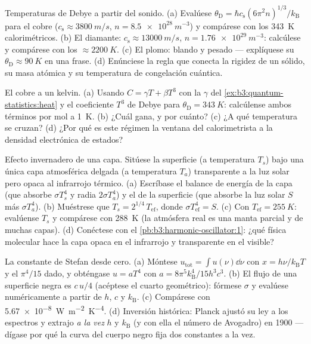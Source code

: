\begin{exercise}[$\star\star$]\label{exo:b3:photons-phonons:7}
Temperaturas de Debye a partir del sonido. (a) Evalúese $\theta_{\text{D}} =
\hbar c_{\text{s}}(6\pi^2n)^{1/3}/k_{\text{B}}$ para el cobre
($c_{\text{s}} \approx \qty{3800}{m/s}$, $n =
\qty{8.5e28}{m^{-3}}$) y compárese con los
\qty{343}{K} calorimétricos. (b) El diamante: $c_{\text{s}} \approx
\qty{13000}{m/s}$, $n = \qty{1.76e29}{m^{-3}}$: calcúlese y
compárese con los $\approx\qty{2200}{K}$. (c) El plomo: blando y pesado ---
explíquese su $\theta_{\text{D}} \approx \qty{90}{K}$ en una
frase. (d) Enúnciese la regla que conecta la rigidez de un sólido, su
masa atómica y su temperatura de congelación cuántica.
\end{exercise}

\begin{exercise}[$\star\star$]\label{exo:b3:photons-phonons:8}
El cobre a un kelvin. (a) Usando $C = \gamma T + \beta T^3$ con
la $\gamma$ del \cref{ex:b3:quantum-statistics:heat} y el coeficiente
$T^3$ de Debye para $\theta_{\text{D}} = \qty{343}{K}$: calcúlense
ambos términos por mol a \qty{1}{K}. (b) ¿Cuál gana, y por cuánto? (c) ¿A qué
temperatura se cruzan? (d) ¿Por qué es este
régimen la ventana del calorimetrista a la densidad electrónica de
estados?
\end{exercise}

\begin{exercise}[$\star\star$]\label{exo:b3:photons-phonons:9}
Efecto invernadero de una capa. Sitúese la superficie (a temperatura $T_s$)
bajo una única capa atmosférica delgada (a temperatura $T_a$) transparente
a la luz solar pero opaca al infrarrojo térmico. (a) Escríbase el balance
de energía de la capa (que absorbe $\sigma T_s^4$ y radia
$2\sigma T_a^4$) y el de la superficie (que absorbe la luz solar $S$ más
$\sigma T_a^4$). (b) Muéstrese que $T_s = 2^{1/4}\,T_{\text{ef}}$, donde
$\sigma T_{\text{ef}}^4 = S$. (c) Con $T_{\text{ef}} =
\qty{255}{K}$: evalúense $T_s$ y compárese con \qty{288}{K}
(la atmósfera real es una manta parcial y de muchas capas). (d)
Conéctese con el \cref{pb:b3:harmonic-oscillator:1}: ¿qué física
molecular hace la capa opaca en el infrarrojo y transparente en
el visible?
\end{exercise}

\begin{exercise}[$\star\star\star$]\label{exo:b3:photons-phonons:10}
La constante de Stefan desde cero. (a) Móntese $u_{\text{tot}} =
\int u(\nu)\dd\nu$ con $x = h\nu/k_{\text{B}}T$ y el
$\pi^4/15$ dado, y obténgase $u = aT^4$ con $a =
8\pi^5k_{\text{B}}^4/15h^3c^3$. (b) El flujo de una superficie
negra es $c\,u/4$ (acéptese el cuarto geométrico): fórmese
$\sigma$ y evalúese numéricamente a partir de $h$, $c$ y
$k_{\text{B}}$. (c) Compárese con \qty{5.67e-8}{W.m^{-2}.K^{-4}}.
(d) Inversión histórica: Planck ajustó su ley a los espectros y
extrajo \emph{a la vez} $h$ y $k_{\text{B}}$ (y con ella el número de
Avogadro) en 1900 --- dígase por qué la curva del cuerpo negro fija dos
constantes a la vez.
\end{exercise}


